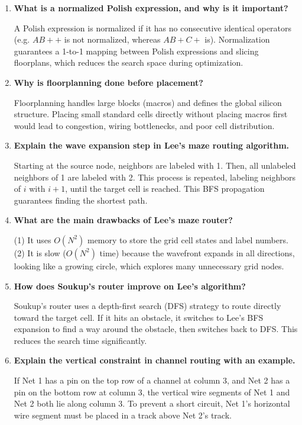 \documentclass[12pt,a4paper]{article}
\newcommand{\Q}[1]{\textbf{#1}\par\noindent\ignorespaces}
\begin{document}
\begin{tcolorbox}[exambox, title={\textbf{Frequently Asked / Viva Questions}}]
\begin{enumerate}[leftmargin=*, topsep=0pt, label=\textbf{Q\arabic*.}, itemsep=6pt]
  \item \Q{What is a normalized Polish expression, and why is it important?}
        A Polish expression is normalized if it has no consecutive identical operators (e.g. $AB++$ is not normalized, whereas $AB+C+$ is). Normalization guarantees a 1-to-1 mapping between Polish expressions and slicing floorplans, which reduces the search space during optimization.
        
  \item \Q{Why is floorplanning done before placement?}
        Floorplanning handles large blocks (macros) and defines the global silicon structure. Placing small standard cells directly without placing macros first would lead to congestion, wiring bottlenecks, and poor cell distribution.
        
  \item \Q{Explain the wave expansion step in Lee's maze routing algorithm.}
        Starting at the source node, neighbors are labeled with 1. Then, all unlabeled neighbors of 1 are labeled with 2. This process is repeated, labeling neighbors of $i$ with $i+1$, until the target cell is reached. This BFS propagation guarantees finding the shortest path.
        
  \item \Q{What are the main drawbacks of Lee's maze router?}
        (1) It uses $O(N^2)$ memory to store the grid cell states and label numbers. (2) It is slow ($O(N^2)$ time) because the wavefront expands in all directions, looking like a growing circle, which explores many unnecessary grid nodes.
        
  \item \Q{How does Soukup's router improve on Lee's algorithm?}
        Soukup's router uses a depth-first search (DFS) strategy to route directly toward the target cell. If it hits an obstacle, it switches to Lee's BFS expansion to find a way around the obstacle, then switches back to DFS. This reduces the search time significantly.
        
  \item \Q{Explain the vertical constraint in channel routing with an example.}
        If Net 1 has a pin on the top row of a channel at column 3, and Net 2 has a pin on the bottom row at column 3, the vertical wire segments of Net 1 and Net 2 both lie along column 3. To prevent a short circuit, Net 1's horizontal wire segment must be placed in a track above Net 2's track.
        

\end{enumerate}
\end{tcolorbox}
\end{document}
